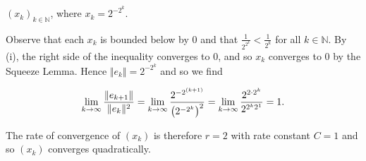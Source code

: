 $(x_k)_{k \in \mathbb{N}}$, where $x_k = 2^{-2^k}$.

\begin{solution}
  Observe that each $x_k$ is bounded below by 0 and that $\frac{1}{2^{2^k}} < \frac{1}{2^k}$ for all 
  $k \in \mathbb{N}$. By (i), the right side of the inequality converges to 0, and so $x_k$ converges to 0 by the 
  Squeeze Lemma. Hence $\Vert e_{k} \Vert = 2^{-2^k}$ and so we find

  $$
    \lim\limits_{k \to \infty} \frac{\Vert e_{k+1} \Vert}{\Vert e_k \Vert^2} 
        = \lim\limits_{k \to \infty} \frac{2^{-2^{(k+1)}}}{\left(2^{-2^k}\right)^2} \\
        = \lim\limits_{k \to \infty} \frac{2^{2 \cdot 2^k}}{2^{2^k 2^1}} \\
        = 1.
  $$

  The rate of convergence of $(x_k)$ is therefore $r = 2$ with rate constant $C = 1$ and so $(x_k)$ converges 
  quadratically.
  \ \\
\end{solution}